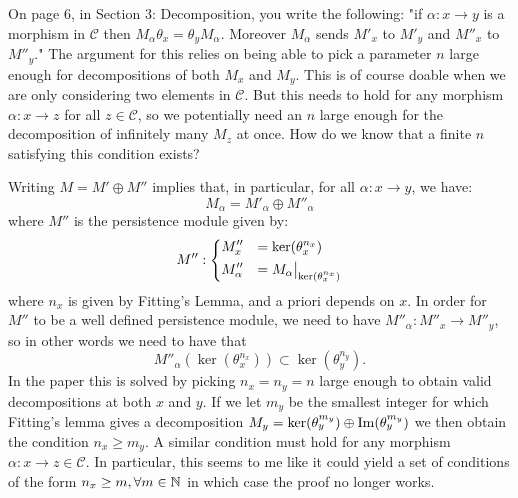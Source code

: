 On page 6, in Section 3: Decomposition, you write the following: "if $\alpha : x \rightarrow y$ is a morphism in $\mathcal{C}$ then $M_{\alpha} \theta_x = \theta_y M_{\alpha}$. Moreover $M_{\alpha}$ sends $M'_x$ to $M'_y$ and $M''_x$ to $M''_y$."
The argument for this relies on being able to pick a parameter $n$ large enough for decompositions of both $M_x$ and $M_y$. 
This is of course doable when we are only considering two elements in $\mathcal{C}$. But this needs to hold for any 
morphism $\alpha : x \rightarrow z$ for all $z \in \mathcal{C}$, so we potentially need an $n$ large enough for the decomposition of 
infinitely many $M_z$ at once. How do we know that a finite $n$ satisfying this condition exists?  

\newpage 

Writing $M = M' \oplus M''$ implies that, in particular, for all $\alpha : x \rightarrow y$, we have:
\begin{equation*}
	M_{\alpha} = M'_{\alpha} \oplus M''_{\alpha}
\end{equation*}
where $M''$ is the persistence module given by: 
\begin{equation*}
	 M'' : 
	\begin{dcases}
		M''_x &= \ker (\theta_x^{n_x}) \\
		M''_{\alpha} &= \restr{M_{\alpha}}{ \ker (\theta_x^{n_x})}  
	\end{dcases}
\end{equation*}
where $n_x$ is given by Fitting's Lemma, and a priori depends on $x$. 
In order for $M''$ to be a well defined persistence module, we need to have $M''_{\alpha} : 	M''_x \rightarrow 	M''_y$, so in other words we need to have that 
\begin{equation*}
	M''_{\alpha} (\ker (\theta_x^{n_x})) \subset \ker (\theta_y^{n_y}).
\end{equation*}
In the paper this is solved by picking $n_x = n_y = n$ large enough to obtain valid decompositions at both $x$ and $y$. If we let $m_y$ be the smallest integer for which Fitting's lemma gives a decomposition $M_y = \ker (\theta_y^{m_y}) \oplus \operatorname{Im} (\theta_y^{m_y})$ we then obtain the condition $n_x \geq m_y$. 
A similar condition must hold for any morphism $\alpha : x \rightarrow z \in \mathcal{C}$. In particular, this seems to me like it could yield a set of conditions of the form $n_x \geq m, \forall m \in \mathbb{N}$ in which case the proof no longer works.


